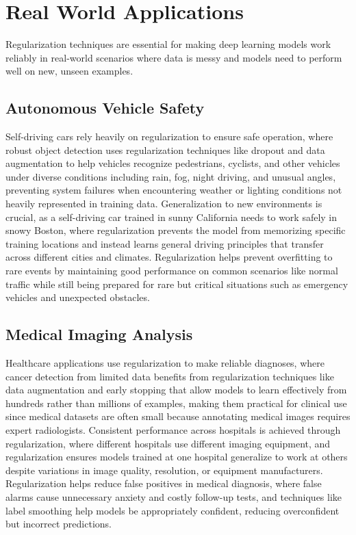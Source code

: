 
\section{Real World Applications}
\label{sec:regularization-real-world}


Regularization techniques are essential for making deep learning models work reliably in real-world scenarios where data is messy and models need to perform well on new, unseen examples.

\subsection{Autonomous Vehicle Safety}

Self-driving cars rely heavily on regularization to ensure safe operation, where robust object detection uses regularization techniques like dropout and data augmentation to help vehicles recognize pedestrians, cyclists, and other vehicles under diverse conditions including rain, fog, night driving, and unusual angles, preventing system failures when encountering weather or lighting conditions not heavily represented in training data. Generalization to new environments is crucial, as a self-driving car trained in sunny California needs to work safely in snowy Boston, where regularization prevents the model from memorizing specific training locations and instead learns general driving principles that transfer across different cities and climates. Regularization helps prevent overfitting to rare events by maintaining good performance on common scenarios like normal traffic while still being prepared for rare but critical situations such as emergency vehicles and unexpected obstacles.

\subsection{Medical Imaging Analysis}

Healthcare applications use regularization to make reliable diagnoses, where cancer detection from limited data benefits from regularization techniques like data augmentation and early stopping that allow models to learn effectively from hundreds rather than millions of examples, making them practical for clinical use since medical datasets are often small because annotating medical images requires expert radiologists. Consistent performance across hospitals is achieved through regularization, where different hospitals use different imaging equipment, and regularization ensures models trained at one hospital generalize to work at others despite variations in image quality, resolution, or equipment manufacturers. Regularization helps reduce false positives in medical diagnosis, where false alarms cause unnecessary anxiety and costly follow-up tests, and techniques like label smoothing help models be appropriately confident, reducing overconfident but incorrect predictions.

